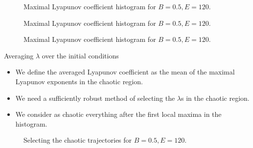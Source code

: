 \documentclass{beamer}
\begin{document}
\begin{frame}
	\begin{figure}
		
		\caption{Maximal Lyapunov coefficient histogram for \(B=0.5, E=120\).}
	\end{figure}
\end{frame}


\begin{frame}
	\begin{figure}
		
		\caption{Maximal Lyapunov coefficient histogram for \(B=0.5, E=120\).}
	\end{figure}
\end{frame}


\begin{frame}
	\begin{figure}
		
		\caption{Maximal Lyapunov coefficient histogram for \(B=0.5, E=120\).}
	\end{figure}
\end{frame}


\begin{frame}{Averaging \(\lambda\) over the initial conditions}
	\begin{itemize}
		\item We define the averaged Lyapunov coefficient as the
		mean of the maximal Lyapunov exponents in the chaotic region.
		\item We need a sufficiently robust method of selecting
		the \(\lambda\)s in the chaotic region.
		\item We consider as chaotic everything after the first
		local maxima in the histogram.
	\end{itemize}
\end{frame}


\begin{frame}
	\begin{figure}
		
		\caption{Selecting the chaotic trajectories for \(B=0.5, E=120\).}
	\end{figure}
\end{frame}
\end{document}
